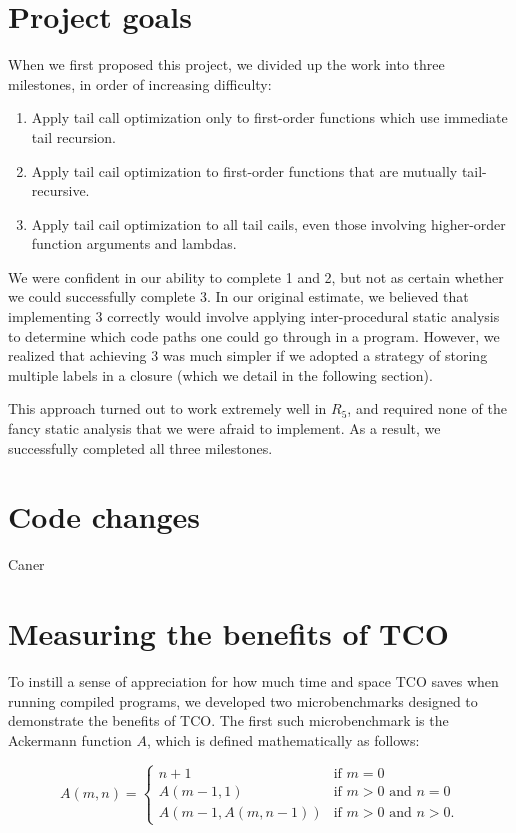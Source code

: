 \documentclass[12pt]{article}
\begin{document}
\section{Project goals}

When we first proposed this project, we divided up the work into three milestones,
in order of increasing difficulty:

\begin{enumerate}
 \item Apply tail call optimization only to first-order functions which use
       immediate tail recursion.
 \item Apply tail cail optimization to first-order functions that are mutually
       tail-recursive.
 \item  Apply tail cail optimization to all tail cails, even those involving
        higher-order function arguments and lambdas.
\end{enumerate}

We were confident in our ability to complete 1 and 2, but not as certain whether
we could successfully complete 3. In our original estimate, we believed that
implementing 3 correctly would involve applying inter-procedural static analysis
to determine which code paths one could go through in a program. However, we
realized that achieving 3 was much simpler if we adopted a strategy of storing
multiple labels in a closure (which we detail in the following section).

This approach turned out to work extremely well in $R_5$, and required none of the
fancy static analysis that we were afraid to implement. As a result, we successfully
completed all three milestones.

\section{Code changes}
Caner

\section{Measuring the benefits of TCO}

To instill a sense of appreciation for how much time and space TCO saves when running
compiled programs, we developed two microbenchmarks designed to demonstrate the benefits
of TCO. The first such microbenchmark is the Ackermann function $A$, which is defined
mathematically as follows:

$$
A(m, n) = \begin{cases}
  n+1               & \mbox{if } m = 0 \\
  A(m-1, 1)         & \mbox{if } m > 0 \mbox{ and } n = 0 \\
  A(m-1, A(m, n-1)) & \mbox{if } m > 0 \mbox{ and } n > 0.
\end{cases}
$$
\end{document}
